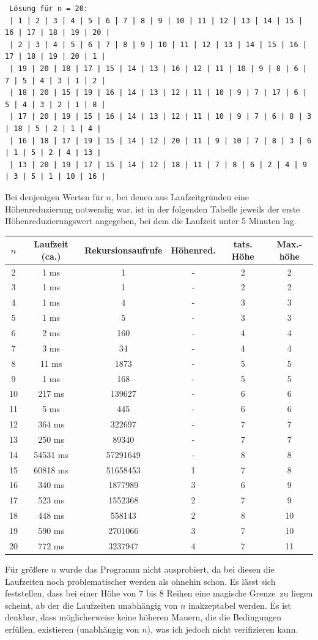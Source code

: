 \documentclass[a4paper, notitlepage, 12pt]{scrartcl}
\begin{document}
\begin{center}
\begin{Verbatim}
 Lösung für n = 20: 
 | 1 | 2 | 3 | 4 | 5 | 6 | 7 | 8 | 9 | 10 | 11 | 12 | 13 | 14 | 15 | 16 | 17 | 18 | 19 | 20 | 
 | 2 | 3 | 4 | 5 | 6 | 7 | 8 | 9 | 10 | 11 | 12 | 13 | 14 | 15 | 16 | 17 | 18 | 19 | 20 | 1 | 
 | 19 | 20 | 18 | 17 | 15 | 14 | 13 | 16 | 12 | 11 | 10 | 9 | 8 | 6 | 7 | 5 | 4 | 3 | 1 | 2 | 
 | 18 | 20 | 15 | 19 | 16 | 14 | 13 | 12 | 11 | 10 | 9 | 7 | 17 | 6 | 5 | 4 | 3 | 2 | 1 | 8 | 
 | 17 | 20 | 19 | 15 | 16 | 14 | 13 | 12 | 11 | 10 | 9 | 7 | 6 | 8 | 3 | 18 | 5 | 2 | 1 | 4 | 
 | 16 | 18 | 17 | 19 | 15 | 14 | 12 | 20 | 11 | 9 | 10 | 7 | 8 | 3 | 6 | 1 | 5 | 2 | 4 | 13 | 
 | 13 | 20 | 19 | 17 | 15 | 14 | 12 | 18 | 11 | 7 | 8 | 6 | 2 | 4 | 9 | 3 | 5 | 1 | 10 | 16 |   
 \end{Verbatim}
 \end{center}
 Bei denjenigen Werten für $n$, bei denen  aus Laufzeitgründen eine Höhenreduzierung notwendig war, ist in der folgenden Tabelle jeweils der erste Höhenreduzierungswert angegeben, bei dem die Laufzeit unter 5 Minuten lag.
 \begin{center}
 \begin{tabular}{|c|c|c|c|c|c|}
  \hline
 $n$ & Laufzeit (ca.) & Rekursionsaufrufe & Höhenred. & tats. Höhe & Max.-höhe \\ \hline
2 & 1 ms & 1 & - & 2& 2\\
3 & 1 ms & 1 & - & 2& 2\\
4 & 1 ms & 4 & - & 3& 3\\
5 & 1 ms & 5 & - & 3& 3\\
6 & 2 ms & 160 & - &4 & 4\\
7 & 3 ms & 34 & - & 4& 4\\
8 & 11 ms & 1873 & - &5 & 5\\
9 & 1 ms & 168 & - & 5& 5\\
10 & 217 ms & 139627 & - &6 & 6\\
11 & 5 ms & 445 & - & 6& 6\\
12 & 364 ms & 322697 & - & 7& 7\\
13 & 250 ms & 89340 & - & 7& 7\\
14 & 54531 ms & 57291649 & - &8 & 8\\ \hline \hline
15 & 60818 ms & 51658453 & 1 & 7& 8\\
16 & 340 ms & 1877989 & 3 & 6& 9\\
17 & 523 ms & 1552368 & 2 & 7& 9\\
18 & 448 ms & 558143 & 2 & 8& 10\\
19 & 590 ms & 2701066 & 3 & 7& 10\\
20 & 772 ms & 3237947 & 4 & 7& 11\\ \hline
 \end{tabular}
 \end{center}
 Für größere $n$ wurde das Programm nicht ausprobiert, da bei diesen die Laufzeiten noch problematischer werden als ohnehin schon. Es lässt sich feststellen, dass bei einer Höhe von 7 bis 8 Reihen eine \glqq magische Grenze\grqq ~zu liegen scheint, ab der die Laufzeiten unabhängig von $n$ inakzeptabel werden. Es ist denkbar, dass möglicherweise keine höheren Mauern, die die Bedingungen erfüllen, existieren (unabhängig von $n$), was ich jedoch nicht verifizieren kann.
\end{document}
